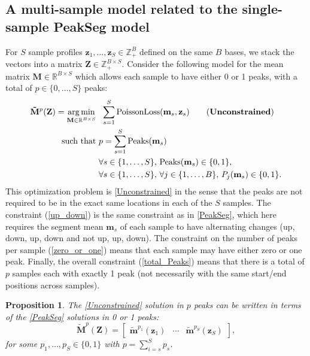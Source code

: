 \documentclass{article} %
\newtheorem{proposition}{Proposition}
\DeclareMathOperator*{\argmin}{arg\,min}
\DeclareMathOperator*{\Peaks}{Peaks}
\newcommand{\RR}{\mathbb R}
\newcommand{\ZZ}{\mathbb Z}
\begin{document}
\subsection{A multi-sample model 
  related to the single-sample PeakSeg
  model}

For $S$ sample profiles $\mathbf z_1, \dots, \mathbf z_S\in\ZZ_+^B$
defined on the same $B$ bases, we stack the vectors into a matrix
$\mathbf Z\in\ZZ_+^{B \times S}$. Consider the following model for the
mean matrix $\mathbf M\in\RR^{B\times S}$ which allows each sample to
have either 0 or 1 peaks, with a total of $p\in\{0, \dots, S\}$ peaks:
\begin{align}
  \label{Unconstrained}
  \mathbf{\tilde M}^p(\mathbf Z)  =
  \argmin_{\mathbf M\in\RR^{B\times S}} &\ \ 
  \sum_{s=1}^S 
  \text{PoissonLoss}(\mathbf m_s, \mathbf z_s) 
  \tag{\textbf{Unconstrained}}
  \\
  \text{such that} &\ p = \sum_{s=1}^S \Peaks(\mathbf m_s)
  \label{total_Peaks}
  \\
  &\ \forall s\in\{1, \dots, S\},\, 
  \Peaks(\mathbf m_s)\in\{0, 1\},  
  \label{zero_or_one}
  \\
  &\ \forall s\in\{1, \dots, S\},\, 
  \forall j\in\{1, \dots, B\},\, P_j(\mathbf m_s) \in\{0, 1\}.
  \label{up_down}
\end{align}
This optimization problem is \ref{Unconstrained} in the sense that the
peaks are not required to be in the exact same locations in each of
the $S$ samples. The constraint (\ref{up_down}) is the same constraint
as in \ref{PeakSeg}, which here requires the segment mean $\mathbf
m_s$ of each sample to have alternating changes (up, down, up, down
and not up, up, down). The constraint on the number of peaks per
sample (\ref{zero_or_one}) means that each sample may have either zero
or one peak. Finally, the overall constraint (\ref{total_Peaks}) means
that there is a total of $p$ samples each with exactly 1 peak (not
necessarily with the same start/end positions across samples).

\begin{proposition}
The \ref{Unconstrained} solution in $p$ peaks
can be written in terms of the \ref{PeakSeg} solutions in 0 or 1 peaks:
\begin{equation}
  \label{eq:unconstrained_PeakSeg}
  \mathbf{\tilde M}^p(\mathbf Z) = \left[
    \begin{array}{ccc}
      \mathbf{\tilde m}^{p_1}(\mathbf z_1) & 
      \cdots &
      \mathbf{\tilde m}^{p_S}(\mathbf z_S) 
    \end{array}
  \right],
\end{equation}
for some $p_1,\dots, p_S\in\{0, 1\}$ with $p=\sum_{i=s}^S p_s$.
\end{proposition}
\end{document}

